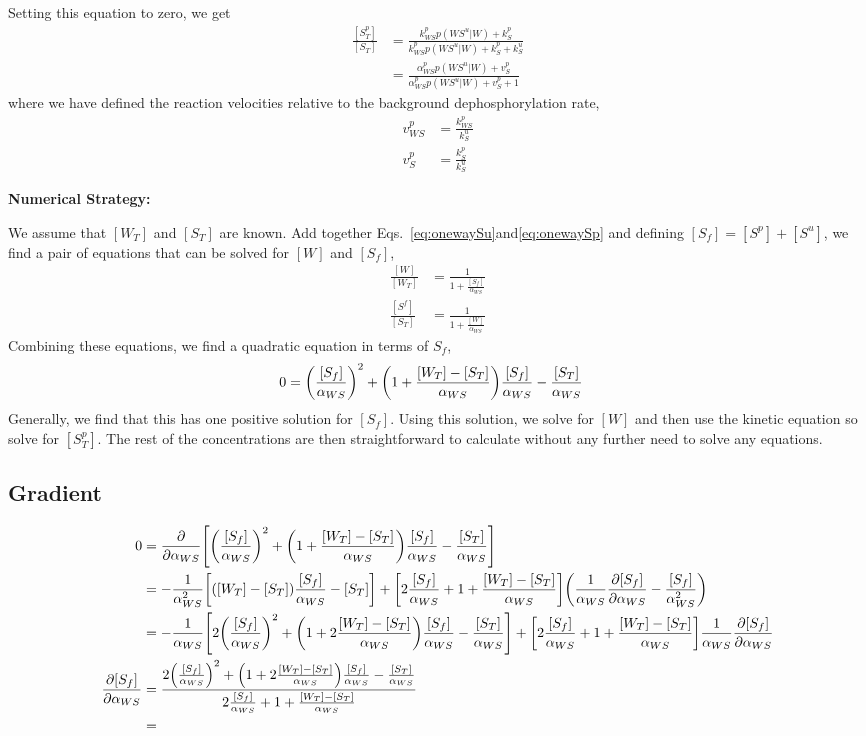 \documentclass[aps,onecolumn,superscriptaddress,notitlepage]{revtex4-1}
\begin{document}
Setting this equation to zero, we get
\begin{align}
\frac{[S_T^p]}{[S_T]} &= \frac{k_{WS}^p p(WS^u|W) + k_S^p}{k_{WS}^p p(WS^u|W) + k_S^p+k_S^u}\\
& = \frac{\alpha_{WS}^p p(WS^u|W) + v_S^p}{\alpha_{WS}^p p(WS^u|W) + v_S^p+1}
\end{align}
where we have defined the reaction velocities relative to the background dephosphorylation rate,
\begin{align}
v_{WS}^p &= \frac{k_{WS}^p}{k_S^u}\\
v_S^p &= \frac{k_S^p}{k_S^u}
\end{align}

\textbf{Numerical Strategy:}

We assume that  $[W_T]$ and $[S_T]$ are known. 
Add together Eqs.~\eqref{eq:onewaySu}and\eqref{eq:onewaySp} and defining $[S_f] = [S^p]+[S^u]$, 
we find a pair of equations that can be solved for $[W]$ and $[S_f]$,
\begin{align}
\frac{[W]}{[W_T]} & = \frac{1}{1 + \frac{[S_f]}{\alpha_{WS}}}\\
\frac{[S^f]}{[S_T]} &= \frac{1}{1 + \frac{[W]}{\alpha_{WS}}}
\end{align}
Combining these equations, we find a quadratic equation in terms of $S_f$,
\begin{align}
0 &= \qty(\frac{[S_f]}{\alpha_{WS}})^2 +  \qty(1+\frac{[W_T]-[S_T]}{\alpha_{WS}})\frac{[S_f]}{\alpha_{WS}} - \frac{[S_T]}{\alpha_{WS}}
\end{align}
Generally, we find that this has one positive solution for $[S_f]$. 
Using this solution, we solve for $[W]$ and then use the kinetic equation so solve for $[S_T^p]$. The rest of the concentrations are then straightforward to calculate without any further need to solve any equations.


\subsection{Gradient}
\begin{align}
0 &= \pdv{}{\alpha_{WS}}\qty[\qty(\frac{[S_f]}{\alpha_{WS}})^2 +  \qty(1+\frac{[W_T]-[S_T]}{\alpha_{WS}})\frac{[S_f]}{\alpha_{WS}} - \frac{[S_T]}{\alpha_{WS}}]\\
&= -\frac{1}{\alpha_{WS}^2}\qty[\qty( [W_T]-[S_T])\frac{[S_f]}{\alpha_{WS}} - [S_T]] + \qty[2 \frac{[S_f]}{\alpha_{WS}} +  1+\frac{[W_T]-[S_T]}{\alpha_{WS}}]\qty(\frac{1}{\alpha_{WS}}\pdv{[S_f]}{\alpha_{WS}} - \frac{[S_f]}{\alpha_{WS}^2})\\
&= -\frac{1}{\alpha_{WS}}\qty[2 \qty(\frac{[S_f]}{\alpha_{WS}})^2 +  \qty(1+2\frac{[W_T]-[S_T]}{\alpha_{WS}})\frac{[S_f]}{\alpha_{WS}}- \frac{[S_T]}{\alpha_{WS}}] + \qty[2 \frac{[S_f]}{\alpha_{WS}} +  1+\frac{[W_T]-[S_T]}{\alpha_{WS}}] \frac{1}{\alpha_{WS}}\pdv{[S_f]}{\alpha_{WS}}\\
\pdv{[S_f]}{\alpha_{WS}} &= \frac{2 \qty(\frac{[S_f]}{\alpha_{WS}})^2 +  \qty(1+2\frac{[W_T]-[S_T]}{\alpha_{WS}})\frac{[S_f]}{\alpha_{WS}}- \frac{[S_T]}{\alpha_{WS}}}{2 \frac{[S_f]}{\alpha_{WS}} +  1+\frac{[W_T]-[S_T]}{\alpha_{WS}}}\\
&= 
\end{align}
\end{document}
